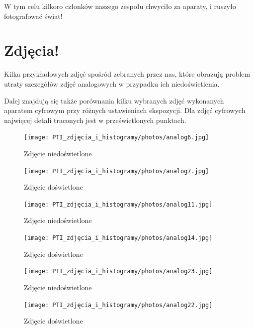 \documentclass[options]{mwart}
\begin{document}
W tym celu kilkoro członków naszego zespołu chwyciło
za aparaty, i ruszyło fotografować świat!

\newpage
\section{Zdjęcia!}
Kilka przykładowych zdjęć spośród zebranych przez nas, które obrazują problem
utraty szczegółów zdjęć analogowych w przypadku ich niedoświetlenia. \newline

Dalej znajdują się także porównania kilku wybranych zdjęć wykonanych
aparatem cyfrowym przy różnych ustawieniach ekspozycji. Dla zdjęć
cyfrowych najwięcej detali traconych jest w prześwietlonych punktach.











\begin{figure}[H]
    \centering
    \texttt{[image: PTI\_zdjęcia\_i\_histogramy/photos/analog6.jpg]}
    \caption{Zdjęcie niedoświetlone}
\end{figure}
\begin{figure}[H]
    \centering
    \texttt{[image: PTI\_zdjęcia\_i\_histogramy/photos/analog7.jpg]}
    \caption{Zdjęcie doświetlone}
\end{figure}



\begin{figure}[H]
    \centering
    \texttt{[image: PTI\_zdjęcia\_i\_histogramy/photos/analog11.jpg]}
    \caption{Zdjęcie niedoświetlone}
\end{figure}
\begin{figure}[H]
    \centering
    \texttt{[image: PTI\_zdjęcia\_i\_histogramy/photos/analog14.jpg]}
    \caption{Zdjęcie doświetlone}
\end{figure}



\begin{figure}[H]
    \centering
    \texttt{[image: PTI\_zdjęcia\_i\_histogramy/photos/analog23.jpg]}
    \caption{Zdjęcie niedoświetlone}
\end{figure}
\begin{figure}[H]
    \centering
    \texttt{[image: PTI\_zdjęcia\_i\_histogramy/photos/analog22.jpg]}
    \caption{Zdjęcie doświetlone}
\end{figure}
\end{document}
